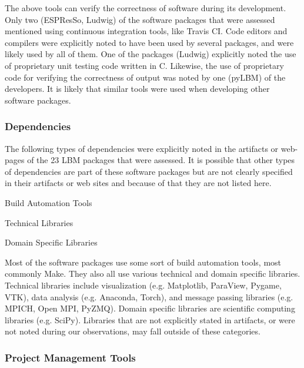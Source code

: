 \documentclass[12pt, notitlepage]{article}
\begin{document}
The above tools can verify the correctness of software during its development. Only two (ESPResSo, Ludwig) of the software packages that were assessed mentioned using continuous integration tools, like Travis CI. Code editors and compilers were explicitly noted to have been used by several packages, and were likely used by all of them. One of the packages (Ludwig) explicitly noted the use of proprietary unit testing code written in C. Likewise, the use of proprietary code for verifying the correctness of output was noted by one (pyLBM) of the developers. It is likely that similar tools were used when developing other software packages. 

\subsubsection{Dependencies}

The following types of dependencies were explicitly noted in the artifacts or web-pages of the 23 LBM packages that were assessed. It is possible that other types of dependencies are part of these software packages but are not clearly specified in their artifacts or web sites and because of that they are not listed here.

	\begin{multicols}{2}	
		\begin{itemize}
		\end{itemize}
	\end{multicols}


Most of the software packages use some sort of build automation tools, most commonly Make. They also all use various technical and domain specific libraries. Technical libraries include visualization (e.g. Matplotlib, ParaView, Pygame, VTK), data analysis (e.g. Anaconda, Torch), and message passing libraries (e.g. MPICH, Open MPI, PyZMQ). Domain specific libraries are scientific computing libraries (e.g. SciPy). Libraries that are not explicitly stated in artifacts, or were not noted during our observations, may fall outside of these categories. 

\subsubsection{Project Management Tools}
\end{document}
